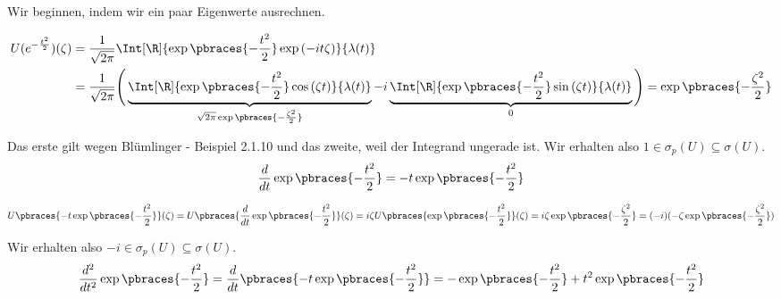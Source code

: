 \begin{solution}

Wir beginnen, indem wir ein paar Eigenwerte ausrechnen.


\begin{align*}
  U(e^{-\frac{t^2}{2}})(\zeta)
  & =
  \frac{1}{\sqrt{2 \pi}}
  \Int[\R]
  {
    \exp \pbraces{-\frac{t^2}{2}}
    \exp{(-i t \zeta)}
  }
  {\lambda(t)} \\
  & =
  \frac{1}{\sqrt{2 \pi}}
  \Bigg (
    \underbrace
    {
    \Int[\R]
    {
    \exp \pbraces{-\frac{t^2}{2}}
    \cos{(\zeta t)}
    }
    {\lambda(t)}
    }_{
    \sqrt{2 \pi}
    \exp \pbraces{-\frac{\zeta^2}{2}}
    } -
    i
    \underbrace
    {
    \Int[\R]
    {
    \exp \pbraces{-\frac{t^2}{2}}
    \sin{(\zeta t)}
    }
    {\lambda(t)}
    }_0
  \Bigg )
  =
  \exp \pbraces{-\frac{\zeta^2}{2}}
\end{align*}

Das erste  gilt wegen Blümlinger - Beispiel 2.1.10 und das zweite, weil der Integrand ungerade ist.
Wir erhalten also $1 \in \sigma_p(U) \subseteq \sigma(U)$. \\

\begin{align*}
  \frac{d}{dt}
  \exp \pbraces{-\frac{t^2}{2}}
  =
  -t \exp \pbraces{-\frac{t^2}{2}}
\end{align*}


\begin{align*}
  U \pbraces{-t \exp \pbraces{-\frac{t^2}{2}}}(\zeta)
  =
  U \pbraces{\frac{d}{dt} \exp \pbraces{-\frac{t^2}{2}}}(\zeta)
  =
  i \zeta U \pbraces{\exp \pbraces{-\frac{t^2}{2}}}(\zeta)
  =
  i \zeta \exp \pbraces{-\frac{\zeta^2}{2}}
  =
  (-i) (-\zeta \exp \pbraces{-\frac{\zeta^2}{2}})
\end{align*}

Wir erhalten also $-i \in \sigma_p(U) \subseteq \sigma(U)$. \\

\begin{align*}
  \frac{d^2}{dt^2}
  \exp \pbraces{-\frac{t^2}{2}}
  =
  \frac{d}{dt}
  \pbraces{-t \exp \pbraces{-\frac{t^2}{2}}}
  =
  -\exp \pbraces{-\frac{t^2}{2}} +
  t^2 \exp \pbraces{-\frac{t^2}{2}}
\end{align*}


\end{solution}
